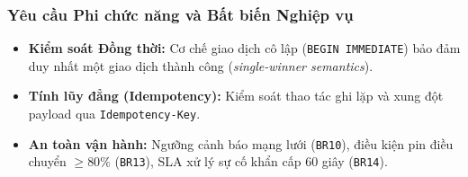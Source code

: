 \begin{frame}
\frametitle{Yêu cầu Phi chức năng và Bất biến Nghiệp vụ}
\begin{itemize}
    \item \textbf{Kiểm soát Đồng thời:} Cơ chế giao dịch cô lập (\texttt{BEGIN IMMEDIATE}) bảo đảm duy nhất một giao dịch thành công (\textit{single-winner semantics}).
    \item \textbf{Tính lũy đẳng (Idempotency):} Kiểm soát thao tác ghi lặp và xung đột payload qua \texttt{Idempotency-Key}.
    \item \textbf{An toàn vận hành:} Ngưỡng cảnh báo mạng lưới (\texttt{BR10}), điều kiện pin điều chuyển $\ge 80\%$ (\texttt{BR13}), SLA xử lý sự cố khẩn cấp 60 giây (\texttt{BR14}).
\end{itemize}
\end{frame}
